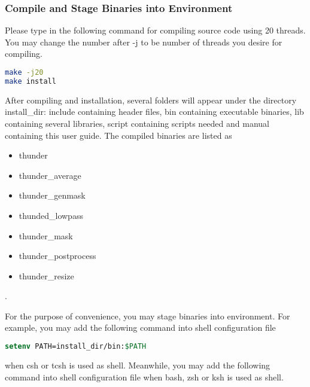 \documentclass{article}
\begin{document}
            \subsubsection{Compile and Stage Binaries into Environment}
            
                Please type in the following command for compiling source code using 20 threads. You may change the number after \textsf{-j} to be number of threads you desire for compiling.
                
                \begin{lstlisting}[language={sh}]
make -j20
make install
                \end{lstlisting}
                
                After compiling and installation, several folders will appear under the directory \textsf{install\_dir}: \textsf{include} containing header files, \textsf{bin} containing executable binaries, \textsf{lib} containing several libraries, \textsf{script} containing scripts needed and \textsf{manual} containing this user guide. The compiled binaries are listed as
                \begin{itemize}
                    \item \textsf{thunder}
                    \item \textsf{thunder\_average}
                    \item \textsf{thunder\_genmask}
                    \item \textsf{thunded\_lowpass}
                    \item \textsf{thunder\_mask}
                    \item \textsf{thunder\_postprocess}
                    \item \textsf{thunder\_resize}
                \end{itemize}.
                
                For the purpose of convenience, you may stage binaries into environment. For example, you may add the following command into shell configuration file
                
                \begin{lstlisting}[language={csh}]
setenv PATH=install_dir/bin:$PATH
                \end{lstlisting}
                
                when \textsf{csh} or \textsf{tcsh} is used as shell. Meanwhile, you may add the following command into shell configuration file when \textsf{bash}, \textsf{zsh} or \textsf{ksh} is used as shell.
                
\end{document}

